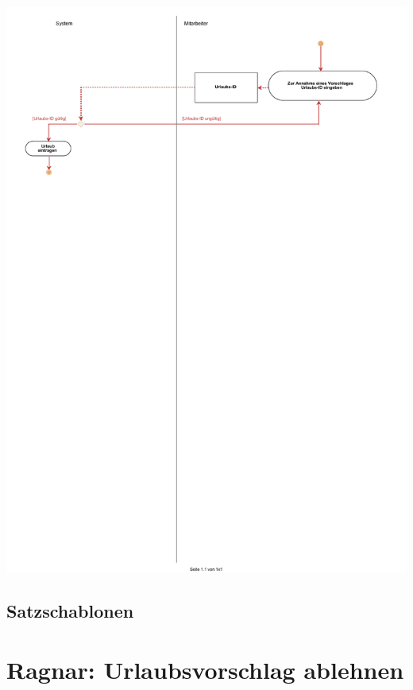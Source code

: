 \begin{center}
\includegraphics[width=0.9\linewidth]{Urlaubsvorschlag_annehmen.pdf}
\end{center}

\subsection{Satzschablonen}


\section{Ragnar: Urlaubsvorschlag ablehnen}

 
